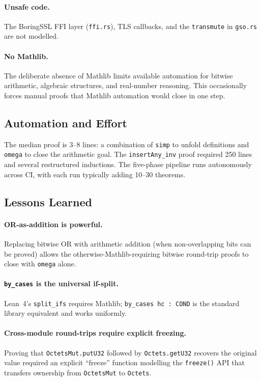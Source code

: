 \documentclass[sigconf,10pt]{acmart}
\begin{document}
\paragraph{Unsafe code.}
The BoringSSL FFI layer (\texttt{ffi.rs}), TLS callbacks, and the
\texttt{transmute} in \texttt{gso.rs} are not modelled.

\paragraph{No Mathlib.}
The deliberate absence of Mathlib limits available automation for
bitwise arithmetic, algebraic structures, and real-number reasoning.
This occasionally forces manual proofs that Mathlib automation would
close in one step.

\subsection{Automation and Effort}

The median proof is 3--8 lines: a combination of \texttt{simp} to
unfold definitions and \texttt{omega} to close the arithmetic goal.
The \texttt{insertAny\_inv} proof required 250 lines and several
restructured inductions.
The five-phase pipeline runs autonomously across CI, with each run
typically adding 10--30 theorems.

\subsection{Lessons Learned}

\paragraph{OR-as-addition is powerful.}
Replacing bitwise OR with arithmetic addition (when non-overlapping bits
can be proved) allows the otherwise-Mathlib-requiring bitwise round-trip
proofs to close with \texttt{omega} alone.

\paragraph{\texttt{by\_cases} is the universal if-split.}
Lean~4's \texttt{split\_ifs} requires Mathlib; \texttt{by\_cases hc :
COND} is the standard library equivalent and works uniformly.

\paragraph{Cross-module round-trips require explicit freezing.}
Proving that \texttt{OctetsMut.putU32} followed by
\texttt{Octets.getU32} recovers the original value required an explicit
``freeze'' function modelling the \texttt{freeze()} API that transfers
ownership from \texttt{OctetsMut} to \texttt{Octets}.
\end{document}
